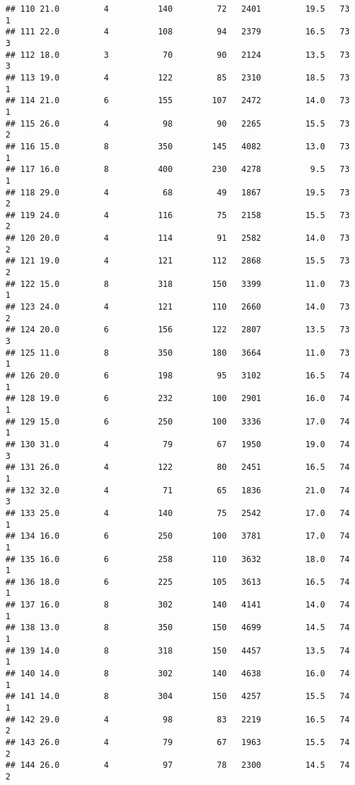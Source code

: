 \documentclass[
]{article}
\begin{document}
\begin{verbatim}
## 110 21.0         4          140         72   2401         19.5   73      1
## 111 22.0         4          108         94   2379         16.5   73      3
## 112 18.0         3           70         90   2124         13.5   73      3
## 113 19.0         4          122         85   2310         18.5   73      1
## 114 21.0         6          155        107   2472         14.0   73      1
## 115 26.0         4           98         90   2265         15.5   73      2
## 116 15.0         8          350        145   4082         13.0   73      1
## 117 16.0         8          400        230   4278          9.5   73      1
## 118 29.0         4           68         49   1867         19.5   73      2
## 119 24.0         4          116         75   2158         15.5   73      2
## 120 20.0         4          114         91   2582         14.0   73      2
## 121 19.0         4          121        112   2868         15.5   73      2
## 122 15.0         8          318        150   3399         11.0   73      1
## 123 24.0         4          121        110   2660         14.0   73      2
## 124 20.0         6          156        122   2807         13.5   73      3
## 125 11.0         8          350        180   3664         11.0   73      1
## 126 20.0         6          198         95   3102         16.5   74      1
## 128 19.0         6          232        100   2901         16.0   74      1
## 129 15.0         6          250        100   3336         17.0   74      1
## 130 31.0         4           79         67   1950         19.0   74      3
## 131 26.0         4          122         80   2451         16.5   74      1
## 132 32.0         4           71         65   1836         21.0   74      3
## 133 25.0         4          140         75   2542         17.0   74      1
## 134 16.0         6          250        100   3781         17.0   74      1
## 135 16.0         6          258        110   3632         18.0   74      1
## 136 18.0         6          225        105   3613         16.5   74      1
## 137 16.0         8          302        140   4141         14.0   74      1
## 138 13.0         8          350        150   4699         14.5   74      1
## 139 14.0         8          318        150   4457         13.5   74      1
## 140 14.0         8          302        140   4638         16.0   74      1
## 141 14.0         8          304        150   4257         15.5   74      1
## 142 29.0         4           98         83   2219         16.5   74      2
## 143 26.0         4           79         67   1963         15.5   74      2
## 144 26.0         4           97         78   2300         14.5   74      2

\end{verbatim}
\end{document}

